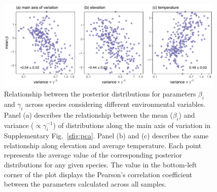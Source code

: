 \documentclass[11pt, a4paper]{article}
\begin{document}
\clearpage

\begin{figure}[ht]
  \centering
    \vspace{0.5cm}
    \includegraphics[width=1\textwidth]{figures/pca-elevation-temperature}
    	  \vspace{0.3cm}
	   \caption{Relationship between the posterior distributions for parameters $\beta_i$ and $\gamma_i$ across species considering different environmental variables. Panel (a) describes the relationship between the mean ($\beta_i$) and variance ($\propto\gamma_i^{-1}$) of distributions along the main axis of variation in Supplementary Fig.~\ref{sfig:pca}. Panel (b) and (c) describes the same relationship along elevation and average temperature. Each point represents the average value of the corresponding posterior distributions for any given species. The value in the bottom-left corner of the plot displays the Pearson's correlation coefficient between the parameters calculated across all samples.}
      \label{sfig:temperature-elevation}
\end{figure}

\clearpage
\end{document}
